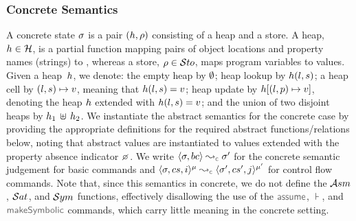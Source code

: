 \subsubsection{Concrete Semantics}
A \jsil concrete state $\sigma$ is a pair $(h, \rho)$ consisting of a heap and a store. 
A heap, $h \in {\mathcal H}$, is a partial function mapping pairs of  object locations and property names (strings) to ,
whereas a store, $\rho \in \mathcal{S}to$, maps \jsil program variables to \jsil values. 
Given a heap~$h$, we denote: the empty heap by $\emptyset$; heap lookup by $h(l, s)$; 
a heap cell by $(l, s) \mapsto v$, meaning that  $h(l,s) = v$; 
heap update by $h[(l, p) \mapsto v]$, denoting the heap $h$ extended with $h(l,s) = v$;
and the union of two disjoint heaps by $h_1 \, \uplus \, h_2$.
We instantiate the abstract semantics for the concrete case by providing the appropriate definitions 
for the required abstract functions/relations below, noting that abstract values are instantiated to
\jsil values extended with the property absence indicator $\none$.
We write $\absbsemrule{\jstate, \bcmd}{\jstate'}{\concrete}$ for the concrete semantic 
judgement for basic commands and $\abssemrule{\jstate, \cs, i}{\jstate', \cs', j}{\mode}{\mode'}{\concrete}$ 
for control flow commands. Note that, since this semantics in concrete, we do not define the $\mathcal{A}{sm}_{}$, $\mathcal{S}at_{}$, 
and $\mathcal{S}ym{}$ functions, effectively disallowing the use of the $\assume\!$, $\assert\!$, and $\makesymbolic\!$ commands,
which carry little meaning in the concrete setting.

